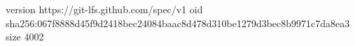 version https://git-lfs.github.com/spec/v1
oid sha256:067f8888d45f9d2418bec24084baac8d478d310be1279d3bec8b9971c7da8ea3
size 4002
